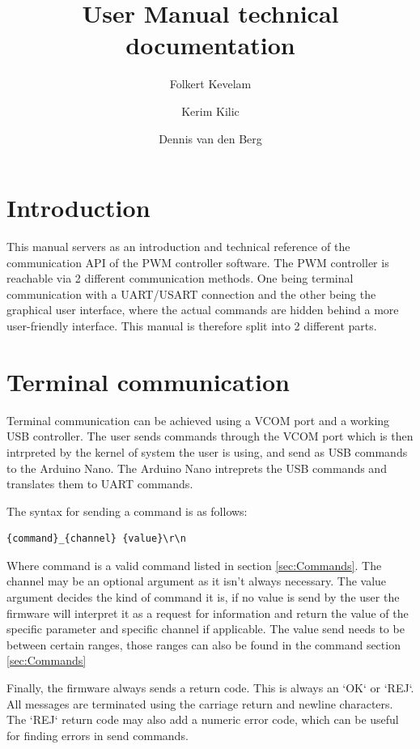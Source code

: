 \documentclass{article}
\title{User Manual technical documentation}
\author{Folkert Kevelam \and Kerim Kilic \and Dennis van den Berg}
\begin{document}
\maketitle
{}
\newpage
\tableofcontents
\newpage


\section{Introduction}
This manual servers as an introduction and technical reference of the communication
API of the PWM controller software. The PWM controller is reachable via 2 different
communication methods. One being terminal communication with a UART/USART connection
and the other being the graphical user interface, where the actual commands are hidden
behind a more user-friendly interface. This manual is therefore split into 2 different
parts.

\section{Terminal communication}
Terminal communication can be achieved using a VCOM port and a working USB controller.
The user sends commands through the VCOM port which is then intrpreted by the kernel
of system the user is using, and send as USB commands to the Arduino Nano. The Arduino Nano
intreprets the USB commands and translates them to UART commands.

The syntax for sending a command is as follows: \\
\begin{lstlisting}
{command}_{channel} {value}\r\n
\end{lstlisting}

Where command is a valid command listed in section \ref{sec:Commands}. The channel
may be an optional argument as it isn't always necessary. The value argument
decides the kind of command it is, if no value is send by the user the firmware
will interpret it as a request for information and return the value of the specific
parameter and specific channel if applicable. The value send needs to be between
certain ranges, those ranges can also be found in the command section \ref{sec:Commands}

Finally, the firmware always sends a return code. This is always an `OK` or `REJ`.
All messages are terminated using the carriage return and newline characters.
The `REJ` return code may also add a numeric error code, which can be useful
for finding errors in send commands.
\end{document}
